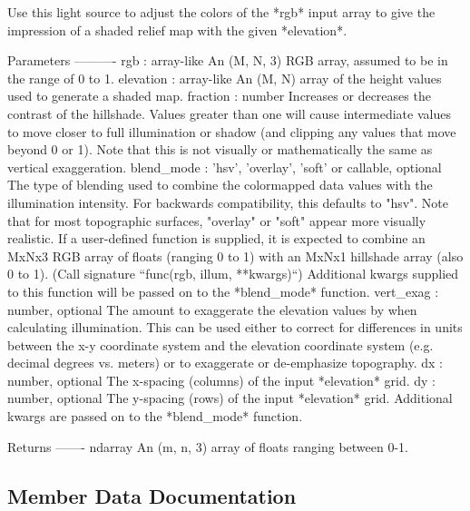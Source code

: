 \begin{DoxyVerb}Use this light source to adjust the colors of the *rgb* input array to
give the impression of a shaded relief map with the given *elevation*.

Parameters
----------
rgb : array-like
    An (M, N, 3) RGB array, assumed to be in the range of 0 to 1.
elevation : array-like
    An (M, N) array of the height values used to generate a shaded map.
fraction : number
    Increases or decreases the contrast of the hillshade.  Values
    greater than one will cause intermediate values to move closer to
    full illumination or shadow (and clipping any values that move
    beyond 0 or 1). Note that this is not visually or mathematically
    the same as vertical exaggeration.
blend_mode : {'hsv', 'overlay', 'soft'} or callable, optional
    The type of blending used to combine the colormapped data values
    with the illumination intensity.  For backwards compatibility, this
    defaults to "hsv". Note that for most topographic surfaces,
    "overlay" or "soft" appear more visually realistic. If a
    user-defined function is supplied, it is expected to combine an
    MxNx3 RGB array of floats (ranging 0 to 1) with an MxNx1 hillshade
    array (also 0 to 1).  (Call signature
    ``func(rgb, illum, **kwargs)``)
    Additional kwargs supplied to this function will be passed on to
    the *blend_mode* function.
vert_exag : number, optional
    The amount to exaggerate the elevation values by when calculating
    illumination. This can be used either to correct for differences in
    units between the x-y coordinate system and the elevation
    coordinate system (e.g. decimal degrees vs. meters) or to
    exaggerate or de-emphasize topography.
dx : number, optional
    The x-spacing (columns) of the input *elevation* grid.
dy : number, optional
    The y-spacing (rows) of the input *elevation* grid.
Additional kwargs are passed on to the *blend_mode* function.

Returns
-------
ndarray
    An (m, n, 3) array of floats ranging between 0-1.
\end{DoxyVerb}
 

\subsection{Member Data Documentation}
\mbox{\label{classmatplotlib_1_1colors_1_1LightSource_a2777dfac6339c6a79f36de3caa2f81de}} 
